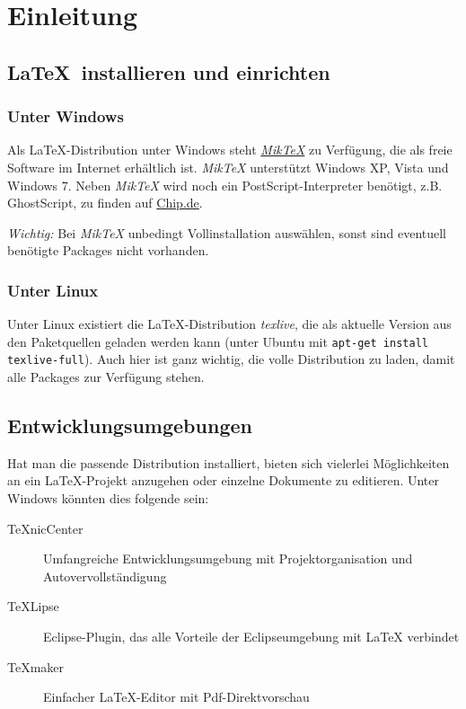 \chapter{Einleitung}

\section{\LaTeX\ installieren und einrichten}
\subsection{Unter Windows}

Als LaTeX-Distribution unter Windows steht \href{http://www.miktex.org/}{\textit{MikTeX}} zu Verfügung, die als freie Software im Internet erhältlich ist. 
\textit{MikTeX} unterstützt Windows XP, Vista und Windows 7. Neben \textit{MikTeX} wird noch ein PostScript-Interpreter benötigt, 
z.B. GhostScript, zu finden auf \href{http://www.chip.de}{Chip.de}.

\textit{Wichtig:} Bei \textit{MikTeX} unbedingt Vollinstallation auswählen, sonst sind eventuell benötigte Packages nicht vorhanden.
  
\subsection{Unter Linux}

Unter Linux existiert die LaTeX-Distribution \textit{texlive}, die als aktuelle Version aus den Paketquellen geladen werden kann (unter Ubuntu mit 
\lstinline{apt-get install texlive-full}). Auch hier ist ganz wichtig, die volle Distribution zu laden, damit alle Packages zur Verfügung stehen.

\section{Entwicklungsumgebungen}

Hat man die passende Distribution installiert, bieten sich vielerlei Möglichkeiten an ein LaTeX-Projekt anzugehen oder einzelne Dokumente zu editieren. Unter
Windows könnten dies folgende sein:

\begin{description}
 \item [TeXnicCenter] Umfangreiche Entwicklungsumgebung mit Projektorganisation und Autovervollständigung
 \item [TeXLipse] Eclipse-Plugin, das alle Vorteile der Eclipseumgebung mit LaTeX verbindet
 \item [TeXmaker] Einfacher LaTeX-Editor mit Pdf-Direktvorschau
\end{description}



